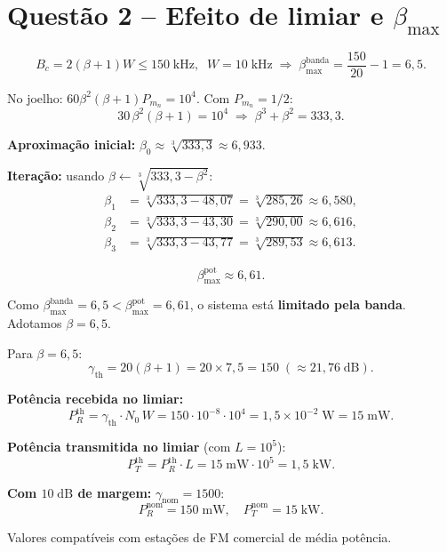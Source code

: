 \documentclass[11pt,a4paper]{article}
\begin{document}
\section*{Questão 2 -- Efeito de limiar e $\beta_{\max}$}

\begin{resolucao}

\[
  B_c = 2(\beta + 1) W \le 150\;\text{kHz}, \;\; W = 10\;\text{kHz}
  \;\Rightarrow\; \boxed{\beta_{\max}^{\text{banda}} = \frac{150}{20} - 1 = 6{,}5.}
\]
\end{resolucao}

\begin{resolucao}

No joelho: $60\beta^2(\beta+1)P_{m_n} = 10^4$. Com $P_{m_n} = 1/2$:
\[
  30\,\beta^2(\beta+1) = 10^4 \;\Rightarrow\; \beta^3 + \beta^2 = 333{,}3.
\]

\textbf{Aproximação inicial:} $\beta_0 \approx \sqrt[3]{333{,}3} \approx 6{,}933$.

\textbf{Iteração:} usando $\beta \leftarrow \sqrt[3]{333{,}3 - \beta^2}$:
\begin{align*}
  \beta_1 &= \sqrt[3]{333{,}3 - 48{,}07} = \sqrt[3]{285{,}26} \approx 6{,}580, \\
  \beta_2 &= \sqrt[3]{333{,}3 - 43{,}30} = \sqrt[3]{290{,}00} \approx 6{,}616, \\
  \beta_3 &= \sqrt[3]{333{,}3 - 43{,}77} = \sqrt[3]{289{,}53} \approx 6{,}613.
\end{align*}

\[
  \boxed{\beta_{\max}^{\text{pot}} \approx 6{,}61.}
\]

Como $\beta_{\max}^{\text{banda}} = 6{,}5 < \beta_{\max}^{\text{pot}} = 6{,}61$, o sistema está \textbf{limitado pela banda}. Adotamos $\beta = 6{,}5$.
\end{resolucao}

\begin{resolucao}

Para $\beta = 6{,}5$:
\[
  \gamma_{\text{th}} = 20(\beta + 1) = 20 \times 7{,}5 = 150 \;(\approx 21{,}76\;\text{dB}).
\]

\textbf{Potência recebida no limiar:}
\[
  P_R^{\text{th}} = \gamma_{\text{th}} \cdot N_0\, W = 150 \cdot 10^{-8} \cdot 10^4 = 1{,}5 \times 10^{-2}\;\text{W} = 15\;\text{mW}.
\]

\textbf{Potência transmitida no limiar} (com $L = 10^5$):
\[
  P_T^{\text{th}} = P_R^{\text{th}}\cdot L = 15\;\text{mW}\cdot 10^5 = 1{,}5\;\text{kW}.
\]

\textbf{Com $10\;\text{dB}$ de margem:} $\gamma_{\text{nom}} = 1500$:
\[
  P_R^{\text{nom}} = 150\;\text{mW}, \quad P_T^{\text{nom}} = 15\;\text{kW}.
\]

Valores compatíveis com estações de FM comercial de média potência.
\end{resolucao}
\end{document}

